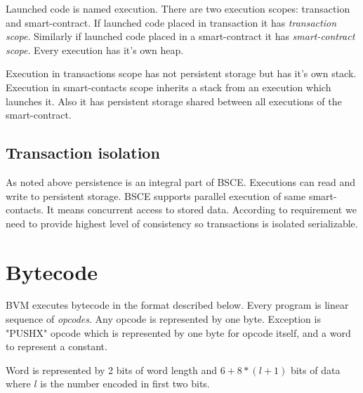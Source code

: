 \documentclass[12pt,a4paper]{article}
\begin{document}
Launched code is named execution. There are two execution scopes: transaction and smart-contract. If launched code placed in transaction it has \textit{transaction scope}. Similarly if launched code placed in a smart-contract it has \textit{smart-contract scope}. Every execution has it's own heap. 

Execution in transactions scope has not persistent storage but has it's own stack. Execution in smart-contacts scope inherits a stack from an execution which launches it. Also it has persistent storage shared between all executions of the smart-contract.

\subsection{Transaction isolation}

As noted above persistence is an integral part of BSCE. Executions can read and write to persistent storage. BSCE supports parallel execution of same smart-contacts. It means concurrent access to stored data. According to requirement we need to provide highest level of consistency so transactions is isolated serializable\cite{transaction-isolation}. 

\section{Bytecode}

BVM executes bytecode in the format described below. Every program is linear sequence of \textit{opcodes}. Any opcode is represented by one byte. Exception is "PUSHX" opcode which is represented by one byte for opcode itself, and a word to represent a constant.

Word is represented by 2 bits of word length and $6+8*(l+1)$ bits of data where $l$ is the number encoded in first two bits.
\end{document}
